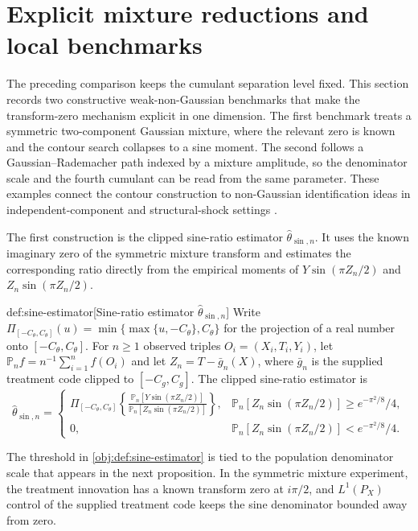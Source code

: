 \section{Explicit mixture reductions and local benchmarks}

The preceding comparison keeps the cumulant separation level fixed. This section records two constructive weak-non-Gaussian benchmarks that make the transform-zero mechanism explicit in one dimension. The first benchmark treats a symmetric two-component Gaussian mixture, where the relevant zero is known and the contour search collapses to a sine moment. The second follows a Gaussian--Rademacher path indexed by a mixture amplitude, so the denominator scale and the fourth cumulant can be read from the same parameter. These examples connect the contour construction to non-Gaussian identification ideas in independent-component and structural-shock settings \citep{Comon1994,HyvarinenOja1997,HyvarinenKarhunenOja2001,LanneMeitzSaikkonen2017,LeeMesters2024,HoeschLeeMesters2024,ReizingerEtAl2025}.

The first construction is the clipped sine-ratio estimator \(\widehat\theta_{\sin,n}\). It uses the known imaginary zero of the symmetric mixture transform and estimates the corresponding ratio directly from the empirical moments of \(Y\sin(\pi Z_n/2)\) and \(Z_n\sin(\pi Z_n/2)\).

\begin{definitionv}{def:sine-estimator}[Sine-ratio estimator \(\widehat\theta_{\sin,n}\)]
Write \(\Pi_{[-C_{\theta},C_{\theta}]}(u)=\min\{\max\{u,-C_{\theta}\},C_{\theta}\}\) for the projection of a real number onto \([-C_{\theta},C_{\theta}]\).  For \(n\ge 1\) observed triples \(O_i=(X_i,T_i,Y_i)\), let \(\mathbb P_n f=n^{-1}\sum_{i=1}^n f(O_i)\) and let \(Z_n=T-\bar g_n(X)\), where \(\bar g_n\) is the supplied treatment code clipped to \([-C_g,C_g]\). The clipped sine-ratio estimator is
\[
\widehat\theta_{\sin,n}
=
\begin{cases}
\displaystyle
\Pi_{[-C_{\theta},C_{\theta}]}
\left\{
\frac{\mathbb P_n[Y\sin(\pi Z_n/2)]}
{\mathbb P_n[Z_n\sin(\pi Z_n/2)]}
\right\},
&\displaystyle \mathbb P_n[Z_n\sin(\pi Z_n/2)]\ge e^{-\pi^2/8}/4,\\[3mm]
0,
&\displaystyle \mathbb P_n[Z_n\sin(\pi Z_n/2)]< e^{-\pi^2/8}/4.
\end{cases}
\]
\end{definitionv}

The threshold in \cref{obj:def:sine-estimator} is tied to the population denominator scale that appears in the next proposition. In the symmetric mixture experiment, the treatment innovation has a known transform zero at \(i\pi/2\), and \(L^1(P_X)\) control of the supplied treatment code keeps the sine denominator bounded away from zero.


